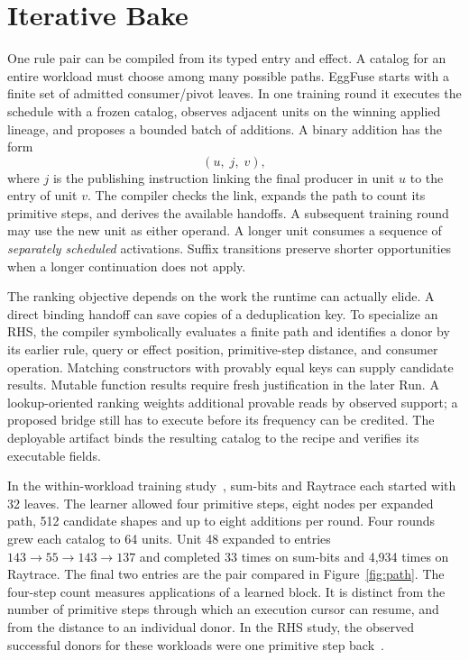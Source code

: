 \documentclass[10pt,letterpaper]{article}
\begin{document}


\section{Iterative Bake}\label{sec:bake}
One rule pair can be compiled from its typed entry and effect. A catalog for an entire workload must choose among many possible paths. EggFuse starts with a finite set of admitted consumer/pivot leaves. In one training round it executes the schedule with a frozen catalog, observes adjacent units on the winning applied lineage, and proposes a bounded batch of additions. A binary addition has the form
\[
                   (u,\;j,\;v),
\]
where \(j\) is the publishing instruction linking the final producer in unit \(u\) to the entry of unit \(v\). The compiler checks the link, expands the path to count its primitive steps, and derives the available handoffs. A subsequent training round may use the new unit as either operand. A longer unit consumes a sequence of \emph{separately scheduled} activations. Suffix transitions preserve shorter opportunities when a longer continuation does not apply.

The ranking objective depends on the work the runtime can actually elide. A direct binding handoff can save copies of a deduplication key. To specialize an RHS, the compiler symbolically evaluates a finite path and identifies a donor by its earlier rule, query or effect position, primitive-step distance, and consumer operation. Matching constructors with provably equal keys can supply candidate results. Mutable function results require fresh justification in the later Run. A lookup-oriented ranking weights additional provable reads by observed support; a proposed bridge still has to execute before its frequency can be credited. The deployable artifact binds the resulting catalog to the recipe and verifies its executable fields.

In the within-workload training study~\cite{bakeartifact}, sum-bits and Raytrace each started with 32 leaves. The learner allowed four primitive steps, eight nodes per expanded path, 512 candidate shapes and up to eight additions per round. Four rounds grew each catalog to 64 units. Unit 48 expanded to entries \(143 \to 55 \to 143 \to 137\) and completed 33 times on sum-bits and 4,934 times on Raytrace. The final two entries are the pair compared in Figure~\ref{fig:path}. The four-step count measures applications of a learned block. It is distinct from the number of primitive steps through which an execution cursor can resume, and from the distance to an individual donor. In the RHS study, the observed successful donors for these workloads were one primitive step back~\cite{bakeartifact}.
\end{document}
